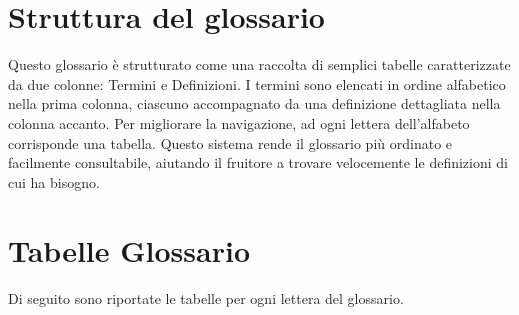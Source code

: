 \documentclass[10pt]{article}
\begin{document}
\section{Struttura del glossario}
Questo glossario è strutturato come una raccolta di semplici tabelle caratterizzate da due colonne: Termini e Definizioni. I termini sono elencati in ordine alfabetico nella prima colonna, ciascuno accompagnato da una definizione dettagliata nella colonna accanto. \newline
Per migliorare la navigazione, ad ogni lettera dell'alfabeto corrisponde una tabella. Questo sistema rende il glossario più ordinato e facilmente consultabile, aiutando il fruitore a trovare velocemente le definizioni di cui ha bisogno.\\

\section{Tabelle Glossario}
Di seguito sono riportate le tabelle per ogni lettera del glossario.

\vspace{2mm}
\renewcommand{\arraystretch}{1.5} %
\setlength{\tabcolsep}{10pt} %

\end{document}
